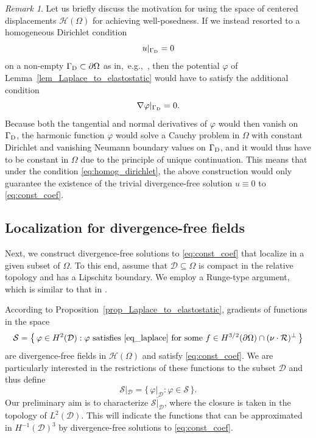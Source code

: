 \documentclass[reqno]{amsart}
\numberwithin{equation}{section}
\numberwithin{figure}{section}
\numberwithin{table}{section}
\newcommand{\D}{\mathcal{D}}
\theoremstyle{definition}
\theoremstyle{plain}
\theoremstyle{definition}
\theoremstyle{remark}
\newtheorem{rem}[thm]{Remark}
\numberwithin{equation}{section}
\begin{document}
\begin{rem} \label{rem_dirichlet}
	Let us briefly discuss the motivation for using the space of centered displacements $\mathcal H(\Omega)$ for achieving well-posedness. If we instead resorted to a homogeneous Dirichlet condition
	\begin{equation} \label{eq:homog_dirichlet}
		u|_{\Gamma_{\textup{D}}} = 0 
	\end{equation}
	on a non-empty $\Gamma_{\textup{D}} \subset \partial\Omega$ as in,~e.g.,~\cite{EGH25,EH21,EP26}, then the potential $\varphi$ of Lemma~\ref{lem_Laplace_to_elastostatic} would have to satisfy the additional condition 
	\begin{equation*}
		\nabla\varphi|_{\Gamma_{\textup{D}}} = 0.
	\end{equation*}
	Because both the tangential and normal derivatives of $\varphi$ would then vanish on $\Gamma_{\textup{D}}$, the harmonic function $\varphi$ would solve a Cauchy problem in $\Omega$ with constant Dirichlet and vanishing Neumann boundary values on $\Gamma_{\textup{D}}$, and it would thus have to be constant in $\Omega$ due to the principle of unique continuation. This means that under the condition \eqref{eq:homog_dirichlet}, the above construction would only guarantee the existence of the trivial divergence-free solution $u \equiv 0$ to \eqref{eq:const_coef}.
\end{rem}

\subsection{Localization for divergence-free fields} \label{sec_loc_for_div_free}

Next, we construct divergence-free solutions to \eqref{eq:const_coef} that localize in a given subset of $\Omega$. To this end, assume that $\D \subseteq \Omega$ is compact in the relative topology and has a Lipschitz boundary. We employ a Runge-type argument, which is similar to that in \cite{HPS19b}. 

According to Proposition~\ref{prop_Laplace_to_elastostatic}, gradients of functions in the space 
%
\begin{equation*}
	\mathcal{S} = \big\{\, \varphi \in  H^2(\D) : \varphi \text{ satisfies  \eqref{eq_laplace} for some } f \in H^{3/2}(\partial \Omega) \cap (\nu \cdot \mathcal{R})^\perp  \,\big\}
\end{equation*}
%
are divergence-free fields in $\mathcal{H}(\Omega)$ and satisfy \eqref{eq:const_coef}. We are particularly interested in the restrictions of these functions to the subset $\D$ and thus define
%
\begin{equation*}
	\mathcal{S}|_{\D} = \{\, \varphi|_{\D} : \varphi \in \mathcal{S} \,\}.
\end{equation*}
%
Our preliminary aim is to characterize $\overline{\mathcal{S}|_{\D}}$, where the closure is taken in the topology of $L^2(\D)$. This will indicate the functions that can be approximated in $H^{-1}(\D)^3$ by divergence-free solutions to \eqref{eq:const_coef}.
\end{document}
